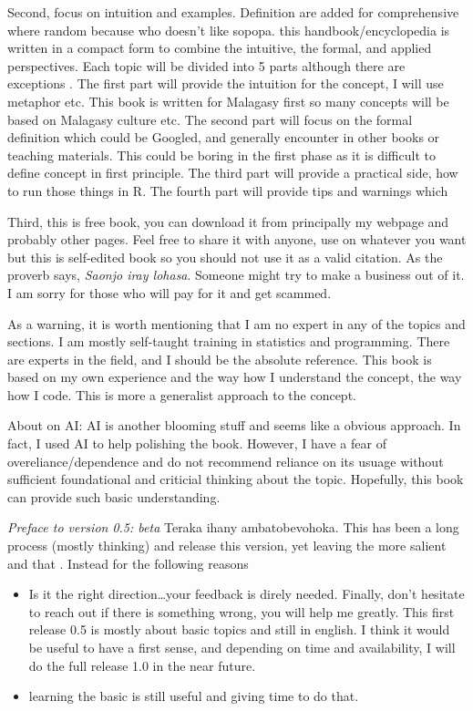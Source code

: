\documentclass[
  letterpaper,
  DIV=11,
  numbers=noendperiod]{scrreprt}
\begin{document}
Second, focus on intuition and examples. Definition are added for
comprehensive where random because who doesn't like sopopa. this
handbook/encyclopedia is written in a compact form to combine the
intuitive, the formal, and applied perspectives. Each topic will be
divided into 5 parts although there are exceptions . The first part will
provide the intuition for the concept, I will use metaphor etc. This
book is written for Malagasy first so many concepts will be based on
Malagasy culture etc. The second part will focus on the formal
definition which could be Googled, and generally encounter in other
books or teaching materials. This could be boring in the first phase as
it is difficult to define concept in first principle. The third part
will provide a practical side, how to run those things in R. The fourth
part will provide tips and warnings which

Third, this is free book, you can download it from principally my
webpage and probably other pages. Feel free to share it with anyone, use
on whatever you want but this is self-edited book so you should not use
it as a valid citation. As the proverb says, \emph{Saonjo iray lohasa}.
Someone might try to make a business out of it. I am sorry for those who
will pay for it and get scammed.

As a warning, it is worth mentioning that I am no expert in any of the
topics and sections. I am mostly self-taught training in statistics and
programming. There are experts in the field, and I should be the
absolute reference. This book is based on my own experience and the way
how I understand the concept, the way how I code. This is more a
generalist approach to the concept.

About on AI: AI is another blooming stuff and seems like a obvious
approach. In fact, I used AI to help polishing the book. However, I have
a fear of overeliance/dependence and do not recommend reliance on its
usuage without sufficient foundational and criticial thinking about the
topic. Hopefully, this book can provide such basic understanding.

\emph{Preface to version 0.5: beta} Teraka ihany ambatobevohoka. This
has been a long process (mostly thinking) and release this version, yet
leaving the more salient and that . Instead for the following reasons

\begin{itemize}
\item
  Is it the right direction\ldots your feedback is direly needed.
  Finally, don't hesitate to reach out if there is something wrong, you
  will help me greatly. This first release 0.5 is mostly about basic
  topics and still in english. I think it would be useful to have a
  first sense, and depending on time and availability, I will do the
  full release 1.0 in the near future.
\item
  learning the basic is still useful and giving time to do that.
\end{itemize}
\end{document}
